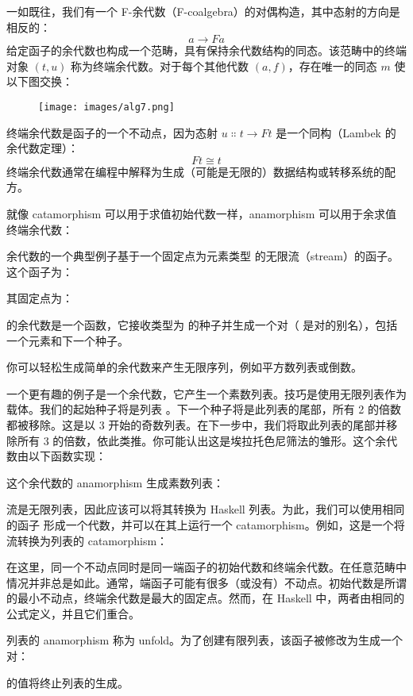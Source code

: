 一如既往，我们有一个 F-余代数（F-coalgebra）的对偶构造，其中态射的方向是相反的：
\[a \to F a\]
给定函子的余代数也构成一个范畴，具有保持余代数结构的同态。该范畴中的终端对象 $(t, u)$ 称为终端余代数。对于每个其他代数 $(a, f)$，存在唯一的同态 $m$ 使以下图交换：

\begin{figure}[H]
  \centering
  \texttt{[image: images/alg7.png]}
\end{figure}

\noindent
终端余代数是函子的一个不动点，因为态射 $u \Colon t \to F t$ 是一个同构（Lambek 的余代数定理）：
\[F t \cong t\]
终端余代数通常在编程中解释为生成（可能是无限的）数据结构或转移系统的配方。

就像 catamorphism 可以用于求值初始代数一样，anamorphism 可以用于余求值终端余代数：

余代数的一个典型例子基于一个固定点为元素类型  的无限流（stream）的函子。这个函子为：

其固定点为：

 的余代数是一个函数，它接收类型为  的种子并生成一个对（ 是对的别名），包括一个元素和下一个种子。

你可以轻松生成简单的余代数来产生无限序列，例如平方数列表或倒数。

一个更有趣的例子是一个余代数，它产生一个素数列表。技巧是使用无限列表作为载体。我们的起始种子将是列表 \code{{[}2..{]}}。下一个种子将是此列表的尾部，所有 2 的倍数都被移除。这是以 3 开始的奇数列表。在下一步中，我们将取此列表的尾部并移除所有 3 的倍数，依此类推。你可能认出这是埃拉托色尼筛法的雏形。这个余代数由以下函数实现：

这个余代数的 anamorphism 生成素数列表：

流是无限列表，因此应该可以将其转换为 Haskell 列表。为此，我们可以使用相同的函子  形成一个代数，并可以在其上运行一个 catamorphism。例如，这是一个将流转换为列表的 catamorphism：

在这里，同一个不动点同时是同一端函子的初始代数和终端余代数。在任意范畴中情况并非总是如此。通常，端函子可能有很多（或没有）不动点。初始代数是所谓的最小不动点，终端余代数是最大的固定点。然而，在 Haskell 中，两者由相同的公式定义，并且它们重合。

列表的 anamorphism 称为 unfold。为了创建有限列表，该函子被修改为生成一个  对：

 的值将终止列表的生成。

